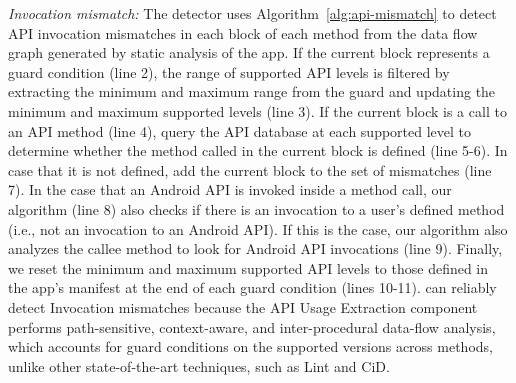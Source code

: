 \textit{Invocation mismatch:} The detector uses
Algorithm~\ref{alg:api-mismatch} 
to detect API invocation
mismatches in each block of each method from the data flow
graph generated by static analysis of the app. If the
current block represents a guard condition (line 2), the
range of supported API levels is filtered by extracting the
minimum and maximum range from the guard and
updating the minimum and maximum supported levels (line 3).
If the current block is a call to an API method (line 4),
query the API database at each supported level to determine
whether the method called in the current block is defined
(line 5-6).  In case that it is not defined, add the current
block to the set of mismatches (line 7).
%
In the case that an Android API is invoked inside a method
call, our algorithm (line 8) also checks if there is an
invocation to a user's defined method (i.e., not an
invocation to an Android API).  If this is the case, our
algorithm also analyzes the callee method  to look
for Android API invocations (line 9).
Finally, we reset the minimum and maximum supported
API levels to those defined in the app's manifest at the end
of each guard condition (lines 10-11).
%
%
%
\@approach can reliably detect Invocation mismatches because
the API Usage Extraction component performs path-sensitive,
context-aware, and inter-procedural data-flow analysis,
which accounts for guard conditions on the
supported versions across methods, unlike other
state-of-the-art techniques, such as {\sc Lint} and {\sc
CiD}.


\begin{algorithm}[t!]
        
\end{algorithm}

